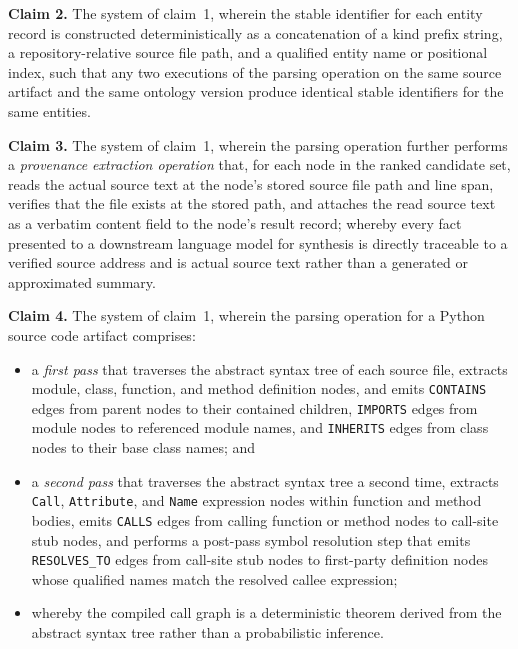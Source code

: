 \documentclass[12pt]{article}
\begin{document}
\bigskip
\noindent\textbf{Claim 2.}\quad
The system of claim~1, wherein the stable identifier for each entity record is
constructed deterministically as a concatenation of a kind prefix string, a
repository-relative source file path, and a qualified entity name or positional
index, such that any two executions of the parsing operation on the same source
artifact and the same ontology version produce identical stable identifiers for
the same entities.

\bigskip
\noindent\textbf{Claim 3.}\quad
The system of claim~1, wherein the parsing operation further performs a
\emph{provenance extraction operation} that, for each node in the ranked
candidate set, reads the actual source text at the node's stored source file path
and line span, verifies that the file exists at the stored path, and attaches the
read source text as a verbatim content field to the node's result record; whereby
every fact presented to a downstream language model for synthesis is directly
traceable to a verified source address and is actual source text rather than a
generated or approximated summary.

\bigskip
\noindent\textbf{Claim 4.}\quad
The system of claim~1, wherein the parsing operation for a Python source code
artifact comprises:
\begin{itemize}[leftmargin=2.5em]
  \item a \emph{first pass} that traverses the abstract syntax tree of each
    source file, extracts module, class, function, and method definition nodes,
    and emits \texttt{CONTAINS} edges from parent nodes to their contained
    children, \texttt{IMPORTS} edges from module nodes to referenced module
    names, and \texttt{INHERITS} edges from class nodes to their base class
    names; and
  \item a \emph{second pass} that traverses the abstract syntax tree a second
    time, extracts \texttt{Call}, \texttt{Attribute}, and \texttt{Name}
    expression nodes within function and method bodies, emits \texttt{CALLS}
    edges from calling function or method nodes to call-site stub nodes, and
    performs a post-pass symbol resolution step that emits \texttt{RESOLVES\_TO}
    edges from call-site stub nodes to first-party definition nodes whose
    qualified names match the resolved callee expression;
  \item whereby the compiled call graph is a deterministic theorem derived from
    the abstract syntax tree rather than a probabilistic inference.
\end{itemize}
\end{document}
